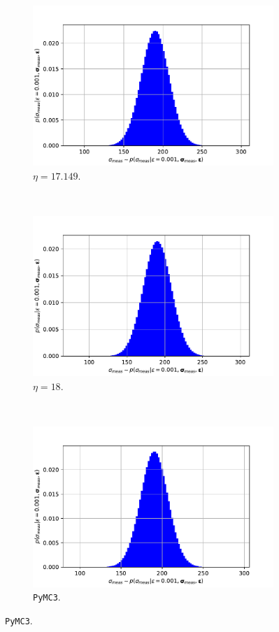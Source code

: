 \documentclass{article}
\begin{document}
	\begin{figure}[htb!]
		\centering
		\begin{subfigure}[b]{0.3\textwidth}
			\centering
			\includegraphics[width=\textwidth]{Q3b_5.pdf}
			\caption{$\eta = 17.149$.}
		\end{subfigure}
		~
		\begin{subfigure}[b]{0.3\textwidth}
			\centering
			\includegraphics[width=\textwidth]{Q3b_7.pdf}
			\caption{$\eta = 18$.}
		\end{subfigure}
		~
		\begin{subfigure}[b]{0.3\textwidth}
			\centering
			\includegraphics[width=\textwidth]{Q3b_6.pdf}
			\caption{\texttt{PyMC3}.}
		\end{subfigure}
		

\end{figure}
\end{document}
